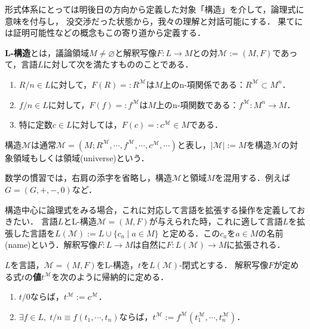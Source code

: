 \documentclass[uplatex, 12pt, dvipdfmx]{jsreport}
\begin{document}
\begin{screen}
    形式体系にとっては明後日の方向から定義した対象「構造」を介して，論理式に意味を付与し，
    没交渉だった状態から，我々の理解と対話可能にする．
    果てには証明可能性などの概念もこの寄り道から定義する．
\end{screen}

\begin{definition}[structure]
    \textbf{L-構造}とは，議論領域$M\ne\varnothing$と解釈写像$F:L\to M$との対$\mathcal{M}:=(M,F)$であって，言語$L$に対して次を満たすもののことである．
    \begin{enumerate}
        \item $R/n\in L$に対して，$F(R)=:R^\mathcal{M}$は$M$上のn-項関係である：$R^\mathcal{M}\subset M^n$．
        \item $f/n\in L$に対して，$F(f)=:f^\mathcal{M}$は$M$上のn-項関数である：$f^\mathcal{M}:M^n\to M$．
        \item 特に定数$c\in L$に対しては，$F(c)=:c^\mathcal{M}\in M$である．
    \end{enumerate}
    構造$\mathcal{M}$は通常$\mathcal{M}=(M;R^\mathcal{M},\cdots,f^\mathcal{M},\cdots,c^\mathcal{M},\cdots)$と表し，$|\mathcal{M}|:=M$を構造$\mathcal{M}$の対象領域もしくは領域(universe)という．
\end{definition}
\begin{remark}
    数学の慣習では，右肩の添字を省略し，構造$\mathcal{M}$と領域$M$を混用する．例えば$G=(G,+,-,0)$など．
\end{remark}

構造中心に論理式をみる場合，これに対応して言語を拡張する操作を定義しておきたい．
言語$L$とL-構造$\mathcal{M}=(M,F)$が与えられた時，これに適して言語$L$を拡張した言語を$L(\mathcal{M}):=L\cup\{c_a\mid a\in M\}$
と定める．この$c_a$を$a\in M$の名前(name)という．解釈写像$F:L\to M$は自然に$F:L(\mathcal{M})\to M$に拡張される．

\begin{definition}
    $L$を言語，$\mathcal{M}=(M,F)$をL-構造，$t$を$L(\mathcal{M})$-閉式とする．
    解釈写像$F$が定める式$t$の\textbf{値}$t^\mathcal{M}$を次のように帰納的に定める．
    \begin{enumerate}
        \item $t/0$ならば，$t^\mathcal{M}:=c^\mathcal{M}$．
        \item $\exists f\in L,\; t/n\equiv f(t_1,\cdots,t_n)$ならば，$t^\mathcal{M}:=f^\mathcal{M}(t^\mathcal{M}_1,\cdots,t^\mathcal{M}_n)$．
    \end{enumerate}
\end{definition}
\end{document}
